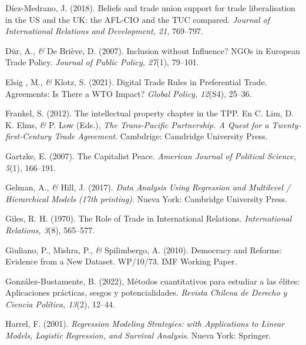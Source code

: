 \documentclass[a4paper]{tufte-handout}
\begin{document}
\begin{list}{}
\item{\small Díez-Medrano, J. (2018). Beliefs and trade union support for trade liberalisation in the US and the UK: the AFL-CIO and the TUC compared. {\itshape Journal of International Relations and Development, 21}, 769--797.}

\item{\small Dür, A., {\itshape \&} De Briève, D. (2007). Inclusion without Influence? NGOs in European Trade Policy. {\itshape Journal of Public Policy, 27}(1), 79--101.}

\item{\small Elsig , M., {\itshape \&} Klotz, S. (2021). Digital Trade Rules in Preferential Trade. Agreements: Is There a WTO Impact? {\itshape Global Policy, 12}(S4), 25--36.}

\item{\small Frankel, S. (2012). The intellectual property chapter in the TPP. En C. Lim, D. K. Elms, {\itshape \&} P. Low (Eds.), {\itshape The Trans-Pacific Partnership. A Quest for a Twenty-first-Century Trade Agreement}. Cambdrige: Camdridge University Press.}

\item{\small Gartzke, E. (2007). The Capitalist Peace. {\itshape American Journal of Political Science, 5}(1), 166--191.}

\item{\small Gelman, A., {\itshape \&} Hill, J. (2017). {\itshape Data Analysis Using Regression and Multilevel / Hierarchical Models (17th printing)}. Nueva York: Cambridge University Press.}

\item{\small Giles, R. H. (1970). The Role of Trade in International Relations. {\itshape International Relations, 3}(8), 565--577.}

\item{\small Giuliano, P., Mishra, P., {\itshape \&} Spilimbergo, A. (2010). Democracy and Reforms: Evidence from a New Dataset. WP/10/73. IMF Working Paper.}

\item{\small González-Bustamente, B. (2022), Métodos cuantitativos para estudiar a las élites: Aplicaciones prácticas, sesgos y potencialidades. {\itshape Revista Chilena de Derecho y Ciencia Política, 13}(2), 12--44. }

\item{\small Harrel, F. (2001). {\itshape Regression Modeling Strategies: with Applications to Linear Models, Logistic Regression, and Survival Analysis}. Nueva York: Springer.}


\end{list}
\end{document}
